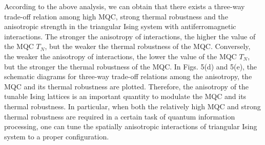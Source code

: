 \documentclass[pra,aps,twocolumn,showpacs]{revtex4}
\begin{document}
According to the above analysis, we can obtain that there exists a three-way trade-off relation among high MQC, strong thermal robustness and the anisotropic strength in the triangular Ising system with antiferromagnetic interactions. The stronger the anisotropy of interactions, the higher the value of the MQC $T_N$, but the weaker the thermal robustness of the MQC. Conversely, the weaker the anisotropy of interactions, the lower the value of the MQC $T_N$, but the stronger the thermal robustness of the MQC. In Figs. 5(d) and 5(e), the schematic diagrams for three-way trade-off relations among the anisotropy, the MQC and its thermal robustness are plotted. Therefore, the anisotropy of the tunable Ising lattices is an important quantity to modulate the MQC and its thermal robustness. In particular, when both the relatively high MQC and strong thermal robustness are required in a certain task of quantum information processing, one can tune the spatially anisotropic interactions of triangular Ising system to a proper configuration.
\end{document}
